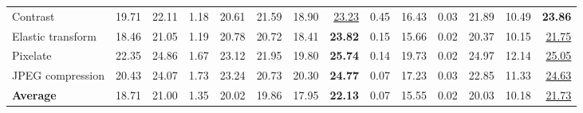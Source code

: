 \begin{table}[t]
{\begin{tabular}{lrrrrrrrrrrrrr}
Contrast & 19.71 & 22.11 & 1.18 & 20.61 & 21.59 & 18.90 & \underline{23.23} & 0.45 & 16.43 & 0.03 & 21.89 & 10.49 & \textbf{23.86} \\
Elastic transform & 18.46 & 21.05 & 1.19 & 20.78 & 20.72 & 18.41 & \textbf{23.82} & 0.15 & 15.66 & 0.02 & 20.37 & 10.15 & \underline{21.75} \\
Pixelate & 22.35 & 24.86 & 1.67 & 23.12 & 21.95 & 19.80 & \textbf{25.74} & 0.14 & 19.73 & 0.02 & 24.97 & 12.14 & \underline{25.05} \\
JPEG compression & 20.43 & 24.07 & 1.73 & 23.24 & 20.73 & 20.30 & \textbf{24.77} & 0.07 & 17.23 & 0.03 & 22.85 & 11.33 & \underline{24.63} \\
\midrule
\textbf{Average} & 18.71 & 21.00 & 1.35 & 20.02 & 19.86 & 17.95 & \textbf{22.13} & 0.07 & 15.55 & 0.02 & 20.03 & 10.18 & \underline{21.73} \\
\bottomrule
\end{tabular}%
}
\end{table}